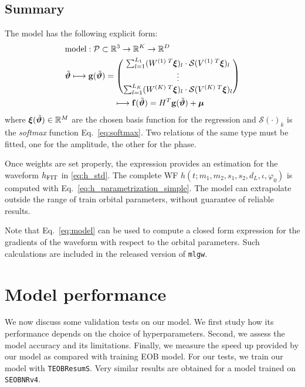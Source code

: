\subsection{Summary}
The model has the following explicit form:
\begin{align}
	& \textrm{model}: \mathcal{P} \subset \mathbb{R}^3 \rightarrow \mathbb{R}^K \rightarrow \mathbb{R}^D \nonumber\\
	& {\tilde{\boldsymbol{\vartheta}}}
	\longmapsto  \mathbf{g}({\tilde{\boldsymbol{\vartheta}}} ) = 
		\begin{pmatrix}
		\sum_{l=1}^{L_1} (W^{(1)\;T} \boldsymbol{\xi})_l \cdot \mathcal{S}(V^{(1)\;T}\boldsymbol{\xi})_l \\
		\vdots \\
		\sum_{l=1}^{L_K}  (W^{(K)\;T} \boldsymbol{\xi})_l \cdot \mathcal{S}(V^{(K)\;T}\boldsymbol{\xi})_l
		\end{pmatrix}
	\nonumber \\	
	& \qquad \qquad \qquad \longmapsto \mathbf{f}({\tilde{\boldsymbol{\vartheta}}} ) = H^T \mathbf{g}({\tilde{\boldsymbol{\vartheta}}} ) + \boldsymbol{\mu} \label{eq:model}
\end{align}
where ${\boldsymbol{\xi}}({\tilde{\boldsymbol{\vartheta}}}) \in \mathbb{R}^M $ are the chosen basis function for the regression and $\mathcal{S}(\cdot)_k$ is the \textit{softmax} function Eq.~\eqref{eq:softmax}.
Two relations of the same type must be fitted, one for the amplitude, the other for the phase.

Once weights are set properly, the expression provides an estimation for the waveform $h_{\rm FIT}$ in \eqref{eq:h_std}.
The complete WF $h(t;m_1,m_2, s_1, s_2, d_L, \iota, \varphi_0)$ is computed with Eq.~\eqref{eq:h_parametrization_simple}.
The model can extrapolate outside the range of train orbital parameters, without guarantee of reliable results.

Note that Eq.~\eqref{eq:model} can be used to compute a closed form expression for the gradients 
of the waveform with respect to the orbital parameters. Such calculations are included 
in the released version of \texttt{mlgw}.

\section{Model performance}
\label{sec:performance}
We now discuss some validation tests on our model. We first study how its performance depends on the choice of hyperparameters. Second, we assess the model accuracy and its limitations.
Finally, we measure the speed up provided by our model as compared with training EOB model.
For our tests, we train our model with \texttt{TEOBResumS}. Very similar results are obtained for a model trained on \texttt{SEOBNRv4}.

